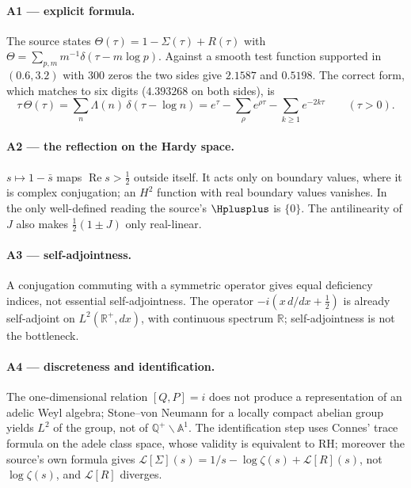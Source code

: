 \paragraph{A1 --- explicit formula.}
The source states \(\Theta(\tau)=1-\Sigma(\tau)+R(\tau)\) with
\(\Theta=\sum_{p,m}m^{-1}\delta(\tau-m\log p)\).  Against a smooth test function supported in
\((0.6,3.2)\) with 300 zeros the two sides give \(2.1587\) and \(0.5198\).  The correct form,
which matches to six digits (\(4.393268\) on both sides), is
\[
\tau\,\Theta(\tau)=\sum_{n}\Lambda(n)\,\delta(\tau-\log n)
=e^{\tau}-\sum_{\rho}e^{\rho\tau}-\sum_{k\ge1}e^{-2k\tau}\qquad(\tau>0).
\]

\paragraph{A2 --- the reflection on the Hardy space.}
\(s\mapsto1-\bar s\) maps \(\operatorname{Re}s>\tfrac12\) outside itself.  It acts only on
boundary values, where it is complex conjugation; an \(H^2\) function with real boundary
values vanishes.  In the only well-defined reading the source's \(\Hplusplus\) is \(\{0\}\).
The antilinearity of \(J\) also makes \(\tfrac12(1\pm J)\) only real-linear.

\paragraph{A3 --- self-adjointness.}
A conjugation commuting with a symmetric operator gives equal deficiency indices, not
essential self-adjointness.  The operator \(-i(x\,d/dx+\tfrac12)\) is already self-adjoint on
\(L^2(\mathbb R^+,dx)\), with continuous spectrum \(\mathbb R\); self-adjointness is not the
bottleneck.

\paragraph{A4 --- discreteness and identification.}
The one-dimensional relation \([Q,P]=i\) does not produce a representation of an adelic Weyl
algebra; Stone--von Neumann for a locally compact abelian group yields \(L^2\) of the group,
not of \(\mathbb Q^+\backslash\mathbb A^1\).  The identification step uses Connes' trace formula
on the adele class space, whose validity is equivalent to RH; moreover the source's own formula
gives \(\mathcal L[\Sigma](s)=1/s-\log\zeta(s)+\mathcal L[R](s)\), not \(\log\zeta(s)\), and
\(\mathcal L[R]\) diverges.


